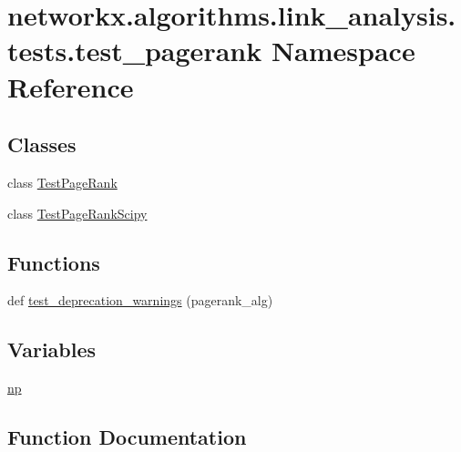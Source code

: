 \hypertarget{namespacenetworkx_1_1algorithms_1_1link__analysis_1_1tests_1_1test__pagerank}{}\section{networkx.\+algorithms.\+link\+\_\+analysis.\+tests.\+test\+\_\+pagerank Namespace Reference}
\label{namespacenetworkx_1_1algorithms_1_1link__analysis_1_1tests_1_1test__pagerank}
\subsection*{Classes}
\begin{DoxyCompactItemize}
\item 
class \hyperlink{classnetworkx_1_1algorithms_1_1link__analysis_1_1tests_1_1test__pagerank_1_1TestPageRank}{Test\+Page\+Rank}
\item 
class \hyperlink{classnetworkx_1_1algorithms_1_1link__analysis_1_1tests_1_1test__pagerank_1_1TestPageRankScipy}{Test\+Page\+Rank\+Scipy}
\end{DoxyCompactItemize}
\subsection*{Functions}
\begin{DoxyCompactItemize}
\item 
def \hyperlink{namespacenetworkx_1_1algorithms_1_1link__analysis_1_1tests_1_1test__pagerank_a89aa08ca48a4f32f0dc19922b2e407c6}{test\+\_\+deprecation\+\_\+warnings} (pagerank\+\_\+alg)
\end{DoxyCompactItemize}
\subsection*{Variables}
\begin{DoxyCompactItemize}
\item 
\hyperlink{namespacenetworkx_1_1algorithms_1_1link__analysis_1_1tests_1_1test__pagerank_a8f4b01a89a8ab7dc209dcdb6c83e6142}{np}
\end{DoxyCompactItemize}


\subsection{Function Documentation}
\mbox{\label{namespacenetworkx_1_1algorithms_1_1link__analysis_1_1tests_1_1test__pagerank_a89aa08ca48a4f32f0dc19922b2e407c6}} 
